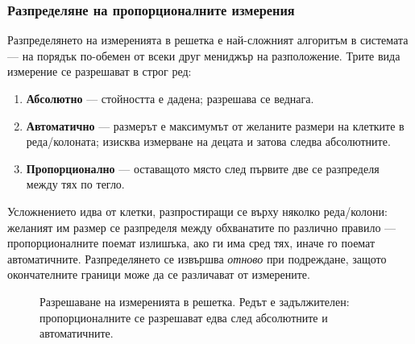 \subsubsection{Разпределяне на пропорционалните измерения}

Разпределянето на измеренията в решетка е най-сложният алгоритъм в системата --- на
порядък по-обемен от всеки друг мениджър на разположение. Трите вида измерение се
разрешават в строг ред:

\begin{enumerate}[topsep=2pt,itemsep=1pt,leftmargin=*]
\item \textbf{Абсолютно} --- стойността е дадена; разрешава се веднага.
\item \textbf{Автоматично} --- размерът е максимумът от желаните размери на клетките в
      реда/колоната; изисква измерване на децата и затова следва абсолютните.
\item \textbf{Пропорционално} --- оставащото място след първите две се разпределя между
      тях по тегло.
\end{enumerate}

Усложнението идва от клетки, разпростиращи се върху няколко реда/колони: желаният им
размер се разпределя между обхванатите по различно правило --- пропорционалните поемат
излишъка, ако ги има сред тях, иначе го поемат автоматичните. Разпределянето се извършва
\emph{отново} при подреждане, защото окончателните граници може да се различават от
измерените.

\begin{figure}[H]
\centering
{}
\caption{Разрешаване на измеренията в решетка. Редът е задължителен: пропорционалните се
разрешават едва след абсолютните и автоматичните.}
\label{fig:grid_resolve}
\end{figure}

